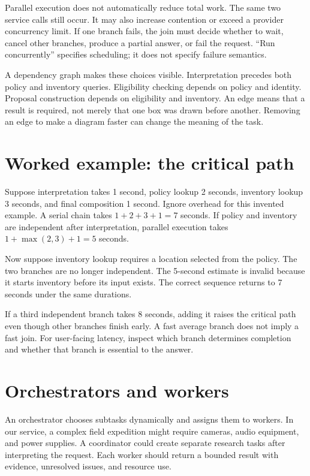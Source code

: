 Parallel execution does not automatically reduce total work. The same two service calls still occur. It may also increase contention or exceed a provider concurrency limit. If one branch fails, the join must decide whether to wait, cancel other branches, produce a partial answer, or fail the request. “Run concurrently” specifies scheduling; it does not specify failure semantics.

A dependency graph makes these choices visible. Interpretation precedes both policy and inventory queries. Eligibility checking depends on policy and identity. Proposal construction depends on eligibility and inventory. An edge means that a result is required, not merely that one box was drawn before another. Removing an edge to make a diagram faster can change the meaning of the task.

\section{Worked example: the critical path}
Suppose interpretation takes 1 second, policy lookup 2 seconds, inventory lookup 3 seconds, and final composition 1 second. Ignore overhead for this invented example. A serial chain takes \(1+2+3+1=7\) seconds. If policy and inventory are independent after interpretation, parallel execution takes \(1+\max(2,3)+1=5\) seconds.

Now suppose inventory lookup requires a location selected from the policy. The two branches are no longer independent. The 5-second estimate is invalid because it starts inventory before its input exists. The correct sequence returns to 7 seconds under the same durations.

If a third independent branch takes 8 seconds, adding it raises the critical path even though other branches finish early. A fast average branch does not imply a fast join. For user-facing latency, inspect which branch determines completion and whether that branch is essential to the answer.

\section{Orchestrators and workers}
An orchestrator chooses subtasks dynamically and assigns them to workers. In our service, a complex field expedition might require cameras, audio equipment, and power supplies. A coordinator could create separate research tasks after interpreting the request. Each worker should return a bounded result with evidence, unresolved issues, and resource use.

